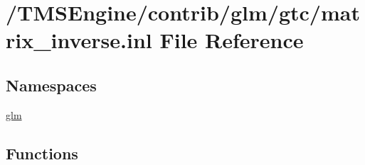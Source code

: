 \hypertarget{matrix__inverse_8inl}{}\section{/\+T\+M\+S\+Engine/contrib/glm/gtc/matrix\+\_\+inverse.inl File Reference}
\label{matrix__inverse_8inl}
\subsection*{Namespaces}
\begin{DoxyCompactItemize}
\item 
 \hyperlink{namespaceglm}{glm}
\end{DoxyCompactItemize}
\subsection*{Functions}
